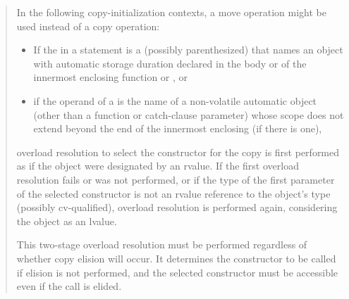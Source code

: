 \begin{quote}
\setcounter{Paras}{2}
\pnum
In the following copy-initialization contexts, a move operation might be used instead of a copy operation:
\begin{itemize}
\item If the  in a    statement 
is a (possibly parenthesized) 
that names an object with automatic storage duration declared in the body
or  of the innermost enclosing
function or , or

\item if the operand of a 
is the name of a non-volatile automatic object
(other than a function or catch-clause parameter)
whose scope does not extend beyond the end of the innermost enclosing
 (if there is one),
\end{itemize}
overload resolution to select the constructor
for the copy  is first performed as if the object were designated by an
rvalue.
If the first overload resolution fails or was not performed,
or if the type of the first parameter of the selected
constructor is not an rvalue reference to the object's type (possibly cv-qualified),
overload resolution is performed again, considering the object as an lvalue.
\begin{note}
This two-stage overload resolution must be performed regardless
of whether copy elision will occur. It determines the constructor to be called if
elision is not performed, and the selected constructor must be accessible even if
the call is elided.
\end{note}

\end{quote}
